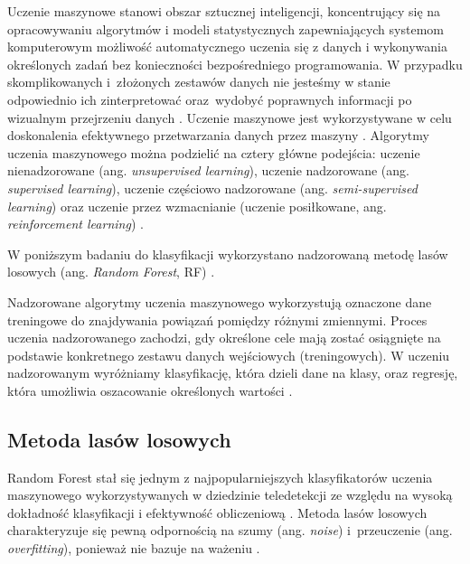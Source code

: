 \documentclass{amuthesis}
\begin{document}
Uczenie maszynowe stanowi obszar sztucznej inteligencji, koncentrujący
się na opracowywaniu algorytmów i modeli statystycznych zapewniających
systemom komputerowym możliwość automatycznego uczenia się z danych i
wykonywania określonych zadań bez konieczności bezpośredniego
programowania. W przypadku skomplikowanych i~złożonych zestawów danych
nie jesteśmy w stanie odpowiednio ich zinterpretować oraz~wydobyć
poprawnych informacji po wizualnym przejrzeniu danych
\autocite{mahesh_2019_ml}. Uczenie maszynowe jest wykorzystywane w celu
doskonalenia efektywnego przetwarzania danych przez maszyny
\autocite{sindayigaya_2022_ml}. Algorytmy uczenia maszynowego można
podzielić na cztery główne podejścia: uczenie nienadzorowane (ang.
\emph{unsupervised learning}), uczenie nadzorowane (ang.
\emph{supervised learning}), uczenie częściowo nadzorowane (ang.
\emph{semi-supervised learning}) oraz uczenie przez wzmacnianie (uczenie
posiłkowane, ang. \emph{reinforcement learning})
\autocite{sarker_2021_ml}.

W poniższym badaniu do klasyfikacji wykorzystano nadzorowaną metodę
lasów losowych (ang. \emph{Random Forest}, RF)
\autocite{breiman_2001_rf}.

Nadzorowane algorytmy uczenia maszynowego wykorzystują oznaczone dane
treningowe do znajdywania powiązań pomiędzy różnymi zmiennymi. Proces
uczenia nadzorowanego zachodzi, gdy określone cele mają zostać
osiągnięte na podstawie konkretnego zestawu danych wejściowych
(treningowych). W uczeniu nadzorowanym wyróżniamy klasyfikację, która
dzieli dane na klasy, oraz regresję, która umożliwia oszacowanie
określonych wartości \autocite{sarker_2021_ml}.

\hypertarget{sec-random-forest}{%
\subsection{Metoda lasów losowych}\label{sec-random-forest}}

Random Forest stał się jednym z najpopularniejszych klasyfikatorów
uczenia maszynowego wykorzystywanych w dziedzinie teledetekcji ze
względu na wysoką dokładność klasyfikacji i efektywność obliczeniową
\autocite{belgiu_2016_rf,sheykhmousa_2020_svm_vs_rf}. Metoda lasów
losowych charakteryzuje się pewną odpornością na szumy (ang.
\emph{noise}) i~przeuczenie (ang. \emph{overfitting}), ponieważ nie
bazuje na ważeniu \autocite{gislason_2006_rf}.
\end{document}
